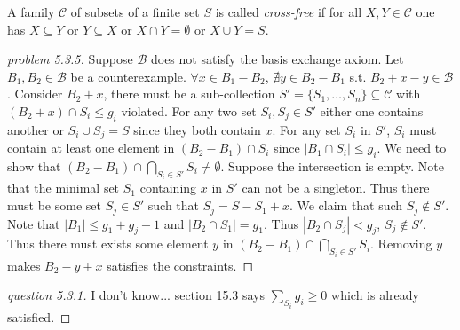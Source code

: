 \documentclass[12pt]{article}
\begin{document}
\begin{definition}
    A family $\mathcal C$ of subsets of a finite set $S$ is called \emph{cross-free} if for all $X, Y \in \mathcal{C}$ one has $X\subseteq Y$ or $Y\subseteq X$ or $X\cap Y=\emptyset$ or $X\cup Y=S$.
\end{definition}
\begin{proof}[problem 5.3.5]
    Suppose $\mathcal{B}$ does not satisfy the basis exchange axiom.
    Let $B_1,B_2\in \mathcal B$ be a counterexample. $\forall x\in B_1-B_2$, $\nexists y\in B_2-B_1$ s.t. $B_2+x-y\in\mathcal B$. Consider $B_2+x$, there must be a sub-collection $S'=\{S_1,\ldots,S_n\}\subseteq \mathcal{C}$ with $(B_2+x)\cap S_i\leq g_i$ violated. For any two set $S_i,S_j\in S'$ either one contains another or $S_i\cup S_j=S$ since they both contain $x$.
    For any set $S_i$ in $S'$, $S_i$ must contain at least one element in $(B_2-B_1)\cap S_i$ since $|B_1\cap S_i|\leq g_i$. We need to show that $(B_2-B_1)\cap \bigcap_{S_i\in S'} S_i\not=\emptyset$. Suppose the intersection is empty. Note that the minimal set $S_1$ containing $x$ in $S'$ can not be a singleton. Thus there must be some set $S_j\in S'$ such that $S_j=S-S_1+x$. We claim that such $S_j\notin S'$. Note that $|B_1|\leq g_1+g_j-1$ and $|B_2\cap S_1|=g_1$. Thus $|B_2\cap S_j|<g_j$, $S_j\notin S'$. Thus there must exists some element $y$ in $(B_2-B_1)\cap \bigcap_{S_i\in S'} S_i$. Removing $y$ makes $B_2-y+x$ satisfies the constraints.
\end{proof}
\begin{proof}[question 5.3.1]
    I don't know... section 15.3 says $\sum_{S_i} g_i\geq 0$ which is already satisfied.
\end{proof}
\end{document}
